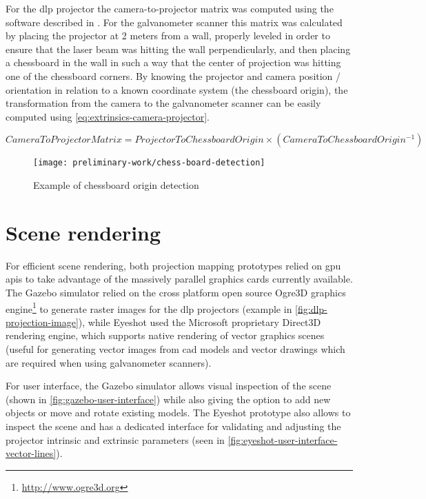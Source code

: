 For the \gls{dlp} projector the camera-to-projector matrix was computed using the software described in \cite{Moreno2012}. For the galvanometer scanner this matrix was calculated by placing the projector at 2 meters from a wall, properly leveled in order to ensure that the laser beam was hitting the wall perpendicularly, and then placing a chessboard in the wall in such a way that the center of projection was hitting one of the chessboard corners. By knowing the projector and camera position / orientation in relation to a known coordinate system (the chessboard origin), the transformation from the camera to the galvanometer scanner can be easily computed using \cref{eq:extrinsics-camera-projector}.

\begin{small}
	\begin{equation}\label{eq:extrinsics-camera-projector}
		CameraToProjectorMatrix = ProjectorToChessboardOrigin \times (CameraToChessboardOrigin^{-1})
	\end{equation}
\end{small}

\begin{figure}[H]
	\centering
	\texttt{[image: preliminary-work/chess-board-detection]}
	\caption{Example of chessboard origin detection}
	\label{fig:chess-board-detection}
\end{figure}



\section{Scene rendering}

For efficient scene rendering, both projection mapping prototypes relied on \gls{gpu} \glspl{api} to take advantage of the massively parallel graphics cards currently available. The Gazebo simulator relied on the cross platform open source Ogre3D graphics engine\footnote{\url{http://www.ogre3d.org}} to generate raster images for the \gls{dlp} projectors (example in \cref{fig:dlp-projection-image}), while Eyeshot used the Microsoft proprietary Direct3D rendering engine, which supports native rendering of vector graphics scenes (useful for generating vector images from \gls{cad} models and vector drawings which are required when using galvanometer scanners).

For user interface, the Gazebo simulator allows visual inspection of the scene (shown in \cref{fig:gazebo-user-interface}) while also giving the option to add new objects or move and rotate existing models. The Eyeshot prototype also allows to inspect the scene and has a dedicated interface for validating and adjusting the projector intrinsic and extrinsic parameters (seen in \cref{fig:eyeshot-user-interface-vector-lines}).


